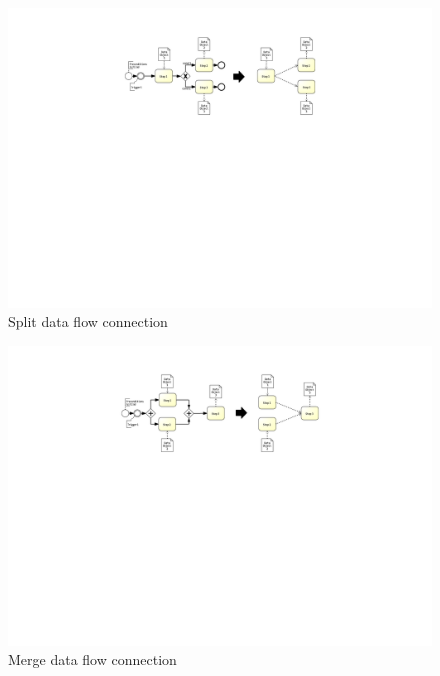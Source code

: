 \begin{figure}[h!]
	\includegraphics[width=13cm, trim={8.5cm 13.8cm 8.5cm 2.2cm}]{img/ExtractDFDGateWaySplit.pdf}
	\caption{Split data flow connection}
	\label{fig:splitDataFlow}
\end{figure}

\begin{figure}[h!]
	\includegraphics[width=14cm, trim={8.5cm 13.5cm 8.5cm 2.0cm}]{img/ExtractDFDGateWayMerge.pdf}
	\caption{Merge data flow connection}
	\label{fig:mergeDataFlow}
\end{figure}


